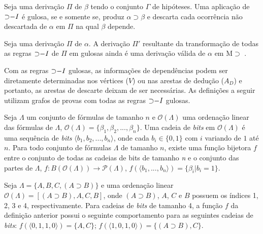 \begin{definition}
Seja uma derivação $\Pi$ de $\beta$ tendo o conjunto $\Gamma$ de hipóteses. Uma aplicação de $\mathord{\supset}{-I}$ é gulosa, se e somente se, produz $\alpha \supset \beta$ e descarta cada ocorrência não descartada de $\alpha$ em $\Pi$ na qual $\beta$ depende.
\end{definition}

\begin{lemma}
Seja uma derivação $\Pi$ de $\alpha$. A derivação $\Pi'$ resultante da transformação de todas as regras $\mathord{\supset}{-I}$ de $\Pi$ em gulosas ainda é uma derivação válida de $\alpha$ em M$\supset$ \cite{GorHaeHCNonPub}.
\end{lemma}

Com as regras $\mathord{\supset}{-I}$ gulosas, as informações de dependências podem ser diretamente determinadas nos vértices ($V$) ou nas arestas de dedução ($A_D$) e portanto, as arestas de descarte deixam de ser necessárias. As definições a seguir utilizam grafos de provas com todas as regras $\mathord{\supset}{-I}$ gulosas.

\vspace{3mm}

\begin{definition}
Seja $\Lambda$ um conjunto de fórmulas de tamanho $n$ e $\mathcal{O}(\Lambda)$ uma ordenação linear das fórmulas de $\Lambda$, $\mathcal{O}(\Lambda) = \{\beta_1, \beta_2, ..., \beta_n\}$. Uma cadeia de \textit{bits} em $\mathcal{O}(\Lambda)$ é uma sequência de \textit{bits} $\langle b_1, b_2, ..., b_n\rangle$, onde cada $b_i \in \{0, 1\}$ com $i$ variando de $1$ até $n$. Para todo conjunto de fórmulas $\Lambda$ de tamanho $n$, existe uma função bijetora $f$ entre o conjunto de todas as cadeias de bits de tamanho \textit{n} e o conjunto das partes de $\Lambda$, $f: B(\mathcal{O}(\Lambda)) \rightarrow \mathcal{P}(\Lambda)$, $f(\langle b_1, ..., b_n\rangle) = \{\beta_i | b_i = 1\}$.
\end{definition}

\begin{example}
Seja $\Lambda = \{A, B, C, (A \supset B)\}$ e uma ordenação linear  $\mathcal{O}(\Lambda) = [(A \supset B), A, C, B]$, onde $(A \supset B)$, $A$, $C$ e $B$ possuem os índices 1, 2, 3 e 4, respectivamente. Para cadeias de \textit{bits} de tamanho 4, a função $f$ da definição anterior possui o seguinte comportamento para as seguintes cadeias de \textit{bits}: $f(\langle 0, 1, 1, 0\rangle) = \{A, C\}$; $f(\langle 1, 0, 1, 0\rangle) = \{(A \supset B), C\}$.
\end{example}

